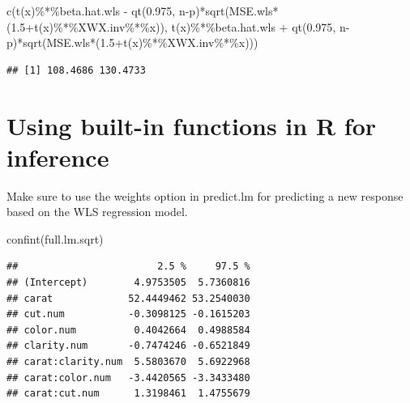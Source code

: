 \documentclass[
]{book}
\newenvironment{Shaded}{\begin{snugshade}}{\end{snugshade}}
\newcommand{\FloatTok}[1]{\textcolor[rgb]{0.00,0.00,0.81}{#1}}
\newcommand{\FunctionTok}[1]{\textcolor[rgb]{0.00,0.00,0.00}{#1}}
\newcommand{\NormalTok}[1]{#1}
\newcommand{\SpecialCharTok}[1]{\textcolor[rgb]{0.00,0.00,0.00}{#1}}
\begin{document}
\begin{Shaded}
\begin{Highlighting}[]
\FunctionTok{c}\NormalTok{(}\FunctionTok{t}\NormalTok{(x)}\SpecialCharTok{\%*\%}\NormalTok{beta.hat.wls }\SpecialCharTok{{-}} \FunctionTok{qt}\NormalTok{(}\FloatTok{0.975}\NormalTok{, n}\SpecialCharTok{{-}}\NormalTok{p)}\SpecialCharTok{*}\FunctionTok{sqrt}\NormalTok{(MSE.wls}\SpecialCharTok{*}\NormalTok{(}\FloatTok{1.5}\SpecialCharTok{+}\FunctionTok{t}\NormalTok{(x)}\SpecialCharTok{\%*\%}\NormalTok{XWX.inv}\SpecialCharTok{\%*\%}\NormalTok{x)), }\FunctionTok{t}\NormalTok{(x)}\SpecialCharTok{\%*\%}\NormalTok{beta.hat.wls }\SpecialCharTok{+} \FunctionTok{qt}\NormalTok{(}\FloatTok{0.975}\NormalTok{, n}\SpecialCharTok{{-}}\NormalTok{p)}\SpecialCharTok{*}\FunctionTok{sqrt}\NormalTok{(MSE.wls}\SpecialCharTok{*}\NormalTok{(}\FloatTok{1.5}\SpecialCharTok{+}\FunctionTok{t}\NormalTok{(x)}\SpecialCharTok{\%*\%}\NormalTok{XWX.inv}\SpecialCharTok{\%*\%}\NormalTok{x)))}
\end{Highlighting}
\end{Shaded}

\begin{verbatim}
## [1] 108.4686 130.4733
\end{verbatim}

\hypertarget{using-built-in-functions-in-r-for-inference}{%
\section{Using built-in functions in R for inference}\label{using-built-in-functions-in-r-for-inference}}

Make sure to use the weights option in predict.lm for predicting a new response based on the WLS regression model.

\begin{Shaded}
\begin{Highlighting}[]
\FunctionTok{confint}\NormalTok{(full.lm.sqrt)}
\end{Highlighting}
\end{Shaded}

\begin{verbatim}
##                        2.5 %     97.5 %
## (Intercept)        4.9753505  5.7360816
## carat             52.4449462 53.2540030
## cut.num           -0.3098125 -0.1615203
## color.num          0.4042664  0.4988584
## clarity.num       -0.7474246 -0.6521849
## carat:clarity.num  5.5803670  5.6922968
## carat:color.num   -3.4420565 -3.3433480
## carat:cut.num      1.3198461  1.4755679
\end{verbatim}
\end{document}
